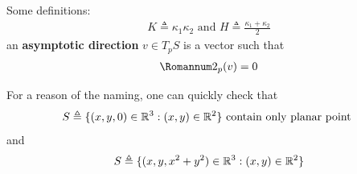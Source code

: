 \documentclass{report}
\begin{document}
\begin{mdframed}
Some definitions: 
\begin{align*}
K\triangleq \kappa_1 \kappa_2 \text{ and }H\triangleq \frac{\kappa_1 +\kappa_2}{2}
\end{align*}
an \textbf{asymptotic direction} $v\in T_pS$ is a vector such that 
\begin{align*}
\Sec_p(v)=0
\end{align*}
\end{mdframed}
\begin{mdframed}
For a reason of the naming, one can quickly check that 
\begin{align*}
S\triangleq \{ (x,y,0)\in\mathbb{R}^3:(x,y)\in\mathbb{R}^2 \}\text{ contain only planar point }
\end{align*}
and 
\begin{align*}
S\triangleq \{ (x,y,x^2+y^2)\in\mathbb{R}^3:(x,y)\in\mathbb{R}^2 \}
\end{align*}

\end{mdframed}
\end{document}
